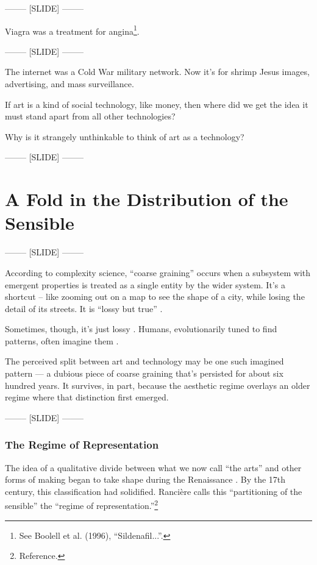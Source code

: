 \documentclass[letter:wpaper]{article}
\begin{document}
    -------- [SLIDE] --------

    Viagra was a treatment for angina\footnote{
        See Boolell et al. (1996), “Sildenafil...”.
    }.

    -------- [SLIDE] --------

    The internet was a Cold War military network. Now it's for shrimp Jesus images, advertising, and mass surveillance.

    If art is a kind of social technology, like money, then where did we get the idea it must stand apart from all other technologies?

    Why is it strangely unthinkable to think of art as a technology?

    -------- [SLIDE] --------

\section{A Fold in the Distribution of the Sensible}
    
-------- [SLIDE] --------

    According to complexity science, ``coarse graining'' occurs when a subsystem with emergent properties is treated as a single entity by the wider system. It’s a shortcut -- like zooming out on a map to see the shape of a city, while losing the detail of its streets. It is ``lossy but true'' \citep[p.4]{FlackCrsGrnng2017}.

    Sometimes, though, it’s just lossy \citep[p.8]{FlackCrsGrnng2017}. Humans, evolutionarily tuned to find patterns, often imagine them \citep{FristonThFrEnrgPrncpl2010}.

    The perceived split between art and technology may be one such imagined pattern — a dubious piece of coarse graining that’s persisted for about six hundred years. It survives, in part, because the aesthetic regime overlays an older regime where that distinction first emerged.
    
-------- [SLIDE] --------

    \subsubsection{The Regime of Representation}

    The idea of a qualitative divide between what we now call ``the arts'' and other forms of making began to take shape during the Renaissance \citep[p.136]{TatarkiewiczWhtIsArt1971}. By the 17th century, this classification had solidified. Rancière calls this ``partitioning of the sensible'' the ``regime of representation.''\footnote{Reference.}
\end{document}

